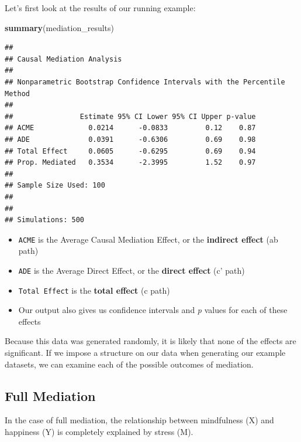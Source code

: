 \documentclass[]{book}
\newenvironment{Shaded}{\begin{snugshade}}{\end{snugshade}}
\newcommand{\KeywordTok}[1]{\textcolor[rgb]{0.13,0.29,0.53}{\textbf{#1}}}
\newcommand{\NormalTok}[1]{#1}
\begin{document}
Let's first look at the results of our running example:

\begin{Shaded}
\begin{Highlighting}[]
\KeywordTok{summary}\NormalTok{(mediation_results)}
\end{Highlighting}
\end{Shaded}

\begin{verbatim}
## 
## Causal Mediation Analysis 
## 
## Nonparametric Bootstrap Confidence Intervals with the Percentile Method
## 
##                Estimate 95% CI Lower 95% CI Upper p-value
## ACME             0.0214      -0.0833         0.12    0.87
## ADE              0.0391      -0.6306         0.69    0.98
## Total Effect     0.0605      -0.6295         0.69    0.94
## Prop. Mediated   0.3534      -2.3995         1.52    0.97
## 
## Sample Size Used: 100 
## 
## 
## Simulations: 500
\end{verbatim}

\begin{itemize}
\item
  \texttt{ACME} is the Average Causal Mediation Effect, or the \textbf{indirect effect} (ab path)
\item
  \texttt{ADE} is the Average Direct Effect, or the \textbf{direct effect} (c' path)
\item
  \texttt{Total\ Effect} is the \textbf{total effect} (c path)
\item
  Our output also gives us confidence intervals and \emph{p} values for each of these effects
\end{itemize}

Because this data was generated randomly, it is likely that none of the effects are significant. If we impose a structure on our data when generating our example datasets, we can examine each of the possible outcomes of mediation.

\hypertarget{full-mediation}{%
\subsection{Full Mediation}\label{full-mediation}}

In the case of full mediation, the relationship between mindfulness (X) and happiness (Y) is completely explained by stress (M).
\end{document}
